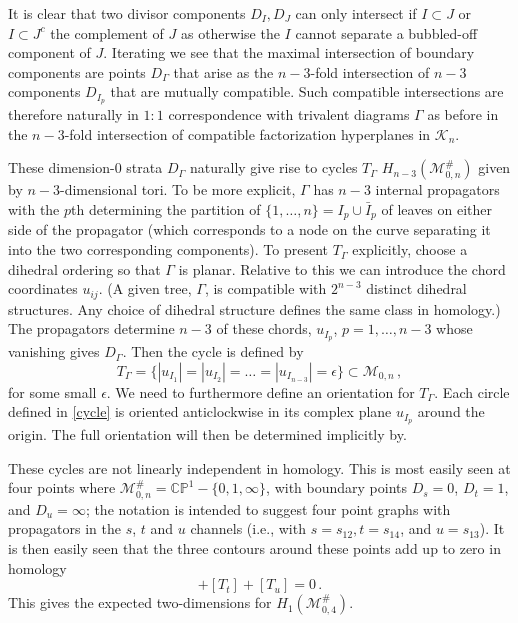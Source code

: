 \documentclass[11pt]{article}
\newcommand{\CP}{\mathbb{CP}}
\newcommand{\cK}{\mathcal{K}}
\newcommand{\cM}{\mathcal{M}}
\newcommand{\1}{{\rm 1\hskip-0.25em I}}
\begin{document}
It is clear that two divisor components $D_I, D_J$ can only intersect if $I\subset J$ or $I\subset J^c$ the complement of $J$ as otherwise the $I$ cannot separate a bubbled-off component of $J$.  Iterating we see that the maximal intersection of boundary components are points $D_\Gamma$ that arise as the $n-3$-fold intersection of $n-3$ components $D_{I_p}$ that are mutually compatible. Such compatible intersections are therefore naturally in $1:1$ correspondence with trivalent diagrams $\Gamma$ as before in the $n-3$-fold intersection of compatible factorization hyperplanes in $\cK_n$.

These dimension-0 strata $D_\Gamma$ naturally give rise to cycles $T_\Gamma$ 
$H_{n-3}(\cM_{0,n}^\#)$ given by $n-3$-dimensional tori. To be more explicit, $\Gamma$  has $n-3$ internal propagators with the $p$th determining the partition of $\{1,\ldots, n\}=I_p\cup \bar I_p$  of leaves on either side of the propagator (which corresponds to a node on the curve separating it into the two corresponding components).  To present $T_\Gamma$ explicitly, choose a dihedral ordering so that $\Gamma$ is planar.  Relative to this we can introduce the chord coordinates $u_{ij}$. (A given tree, $\Gamma$, is compatible with $2^{n-3}$ distinct dihedral structures. Any choice of dihedral structure defines the same class in homology.) The propagators determine  $n-3$ of these chords,  $u_{I_p}$, $p=1,\ldots , n-3$ whose vanishing gives $D_\Gamma$.
Then the cycle  is defined by 
\begin{equation}
T_\Gamma=\{|u_{I_1}|=|u_{I_2}|=\ldots=|u_{I_{n-3}}|=\epsilon\}\subset \cM_{0,n}\, , \label{cycle}
\end{equation}
for some small $\epsilon$.  
We need to furthermore define an orientation for $T_\Gamma$.  Each circle defined in \eqref{cycle} is oriented anticlockwise in its complex plane $u_{I_p}$ around the origin.  The full orientation will then be determined implicitly by.

These cycles are not linearly independent in homology.  This is most easily seen at four points where $\cM^\#_{0,n}=\CP^1-\{0,1,\infty\}$,
with boundary points  $D_{s}=0$, $D_{t}=1$, and $D_{u}=\infty$; the notation is intended to suggest four point graphs with propagators in the $s$, $t$ and $u$ channels (i.e., with $s=s_{12}, t=s_{14}$, and $u=s_{13}$). It is then easily seen that the three contours around these points add up to zero in homology
\begin{equation}
[T_{s}]+[T_{t}]+[T_u]=0\, .
\end{equation}
This gives the  expected two-dimensions for $H_1(\cM^\#_{0,4})$. 
\end{document}
